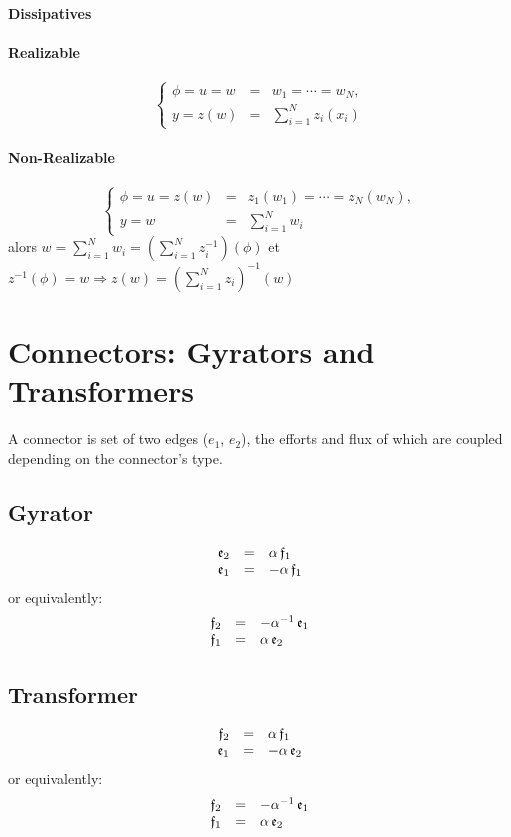 \documentclass[10pt,a4paper]{article}
\begin{document}
\textbf{Dissipatives}
\paragraph{Realizable} 
$$\left\{ \begin{array}{rcl}
\phi = u =w &=& w_1 =\cdots = w_N ,\\
y =z(w)&= &\sum_{i=1}^N z_i(x_i) 
\end{array}\right.$$
\paragraph{Non-Realizable}
$$\left\{ \begin{array}{rcl}
\phi = u =z(w) &=& z_1(w_1) =\cdots = z_N(w_N) ,\\
y = w &=& \sum_{i=1}^Nw_i\end{array}\right.$$
alors $ w =\sum_{i=1}^N w_i=\left(\sum_{i=1}^N z^{-1}_i\right)(\phi) $ et $z^{-1}(\phi) = w\Rightarrow z(w) =  \left(\sum_{i=1}^N z_i\right)^{-1}(w)$ 


\section{Connectors: Gyrators and Transformers}
A connector is set of two edges ($e_1$, $e_2$), the efforts and flux of which are coupled depending on the connector's type.
\subsection{Gyrator}
$$
\begin{array}{rcl}
\mathfrak{e}_2 &=& \alpha \, \mathfrak{f}_1\\ 
\mathfrak{e}_1 &=& -\alpha \, \mathfrak{f}_1
\end{array}
$$
or equivalently:
$$
\begin{array}{rcl}
\mathfrak{f}_2 &=& -\alpha^{-1}\, \mathfrak{e}_1\\ 
\mathfrak{f}_1 &=& \alpha \, \mathfrak{e}_2
\end{array}
$$
\subsection{Transformer}
$$
\begin{array}{rcl}
\mathfrak{f}_2 &=& \alpha \, \mathfrak{f}_1\\ 
\mathfrak{e}_1 &=& -\alpha \, \mathfrak{e}_2
\end{array}
$$
or equivalently:
$$
\begin{array}{rcl}
\mathfrak{f}_2 &=& -\alpha^{-1}\, \mathfrak{e}_1\\ 
\mathfrak{f}_1 &=& \alpha \, \mathfrak{e}_2
\end{array}
$$
\end{document}
